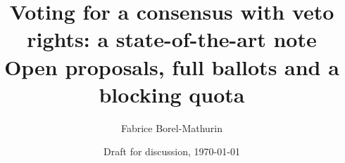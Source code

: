 \title{Voting for a consensus with veto rights: a state-of-the-art note\\[4pt]
\large Open proposals, full ballots and a blocking quota}

\author[1,2]{Fabrice Borel-Mathurin}
\date{Draft for discussion, \today}
